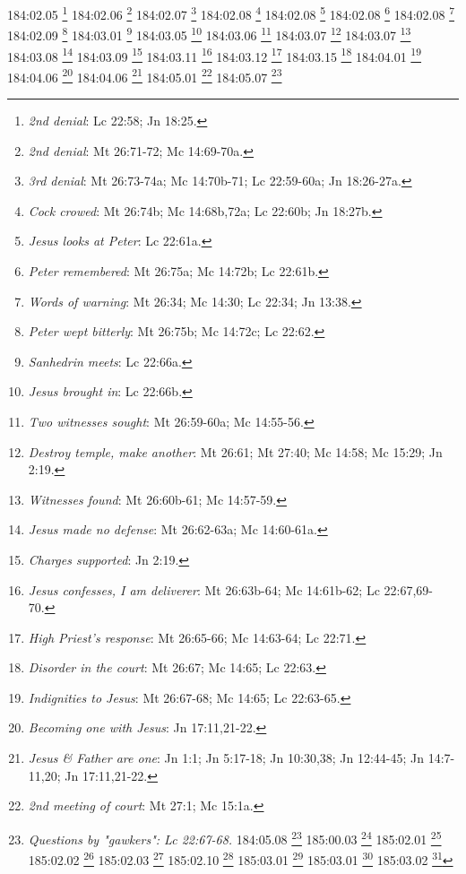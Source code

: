 {{{{{{{{{{{{{{{{{{{{{{{{{{{{{{{{{{{{{{{{{{{{{{{{{{{{{{{{{{{{{{{{{{{{{{{{{{{{{{{{{{{{{{{{{{184:02.05 \footnote{\textit{2nd denial}: Lc 22:58; Jn 18:25.}
184:02.06 \footnote{\textit{2nd denial}: Mt 26:71-72; Mc 14:69-70a.}
184:02.07 \footnote{\textit{3rd denial}: Mt 26:73-74a; Mc 14:70b-71; Lc 22:59-60a; Jn 18:26-27a.}
184:02.08 \footnote{\textit{Cock crowed}: Mt 26:74b; Mc 14:68b,72a; Lc 22:60b; Jn 18:27b.}
184:02.08 \footnote{\textit{Jesus looks at Peter}: Lc 22:61a.}
184:02.08 \footnote{\textit{Peter remembered}: Mt 26:75a; Mc 14:72b; Lc 22:61b.}
184:02.08 \footnote{\textit{Words of warning}: Mt 26:34; Mc 14:30; Lc 22:34; Jn 13:38.}
184:02.09 \footnote{\textit{Peter wept bitterly}: Mt 26:75b; Mc 14:72c; Lc 22:62.}
184:03.01 \footnote{\textit{Sanhedrin meets}: Lc 22:66a.}
184:03.05 \footnote{\textit{Jesus brought in}: Lc 22:66b.}
184:03.06 \footnote{\textit{Two witnesses sought}: Mt 26:59-60a; Mc 14:55-56.}
184:03.07 \footnote{\textit{Destroy temple, make another}: Mt 26:61; Mt 27:40; Mc 14:58; Mc 15:29; Jn 2:19.}
184:03.07 \footnote{\textit{Witnesses found}: Mt 26:60b-61; Mc 14:57-59.}
184:03.08 \footnote{\textit{Jesus made no defense}: Mt 26:62-63a; Mc 14:60-61a.}
184:03.09 \footnote{\textit{Charges supported}: Jn 2:19.}
184:03.11 \footnote{\textit{Jesus confesses, I am deliverer}: Mt 26:63b-64; Mc 14:61b-62; Lc 22:67,69-70.}
184:03.12 \footnote{\textit{High Priest's response}: Mt 26:65-66; Mc 14:63-64; Lc 22:71.}
184:03.15 \footnote{\textit{Disorder in the court}: Mt 26:67; Mc 14:65; Lc 22:63.}
184:04.01 \footnote{\textit{Indignities to Jesus}: Mt 26:67-68; Mc 14:65; Lc 22:63-65.}
184:04.06 \footnote{\textit{Becoming one with Jesus}: Jn 17:11,21-22.}
184:04.06 \footnote{\textit{Jesus & Father are one}: Jn 1:1; Jn 5:17-18; Jn 10:30,38; Jn 12:44-45; Jn 14:7-11,20; Jn 17:11,21-22.}
184:05.01 \footnote{\textit{2nd meeting of court}: Mt 27:1; Mc 15:1a.}
184:05.07 \footnote{\textit{Questions by "gawkers": Lc 22:67-68.}
184:05.08 \footnote{\textit{Jesus led to Pilate}: Mt 27:2; Mc 15:1b; Lc 23:1; Jn 18:28a.}
185:00.03 \footnote{\textit{Trial outside buildings}: Jn 18:28b.}
185:02.01 \footnote{\textit{Pilate asks what accusations}: Jn 18:29-30.}
185:02.02 \footnote{\textit{Pilate}: Why don't you judge Him?: Jn 18:31a.}
185:02.03 \footnote{\textit{Reply}: we can't kill him.: Jn 18:31b.}
185:02.10 \footnote{\textit{Charges against Jesus}: Mt 27:12a; Mc 15:3a; Lc 23:2.}
185:03.01 \footnote{\textit{Jesus' view on tribute}: Mt 22:21; Mc 12:17; Lc 20:25.}
185:03.01 \footnote{\textit{Pilate questions Jesus}: Jn 18:33a.}
185:03.02 \footnote{\textit{Are you King of Jews?: Mt 27:11a; Mc 15:2a; Lc 23:3a; Jn 18:33b.}
185:03.02 \footnote{\textit{Why do you ask?: Jn 18:34-35.}
}}}}}}}}}}}}}}}}}}}}}}}}}}}}}}}}}}}}}}}}}}}}}}}}}}}}}}}}}}}}}}}}}}}}}}}}}}}}}}}}}}}}}}}}}}}}}
